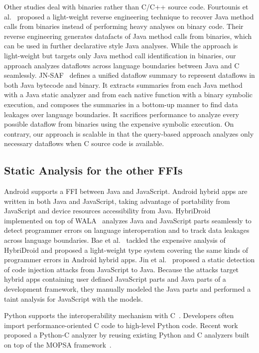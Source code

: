 Other studies deal with binaries rather than C/C++ source code.  Fourtounis et
al.~\cite{scanning} proposed a light-weight reverse engineering technique to
recover Java method calls from binaries instead of performing heavy analyses on
binary code.  Their reverse engineering generates datafacts of Java method
calls from binaries, which can be used in further declarative style Java
analyses. While the approach is light-weight but targets only Java method call
identification in binaries, our approach analyzes dataflows across language
boundaries between Java and C seamlessly.  JN-SAF~\cite{JN-SAF} defines a
unified dataflow summary to represent dataflows in both Java bytecode and
binary.  It extracts summaries from each Java method with a Java static
analyzer and from each native function with a binary symbolic execution, and
composes the summaries in a bottom-up manner to find data leakages over
language boundaries.  It sacrifices performance to analyze every possible
dataflow from binaries using the expensive symbolic execution. On contrary, our
approach is scalable in that the query-based approach analyzes only necessary
dataflows when C source code is available.


\subsection{Static Analysis for the other FFIs}
Android supports a FFI between Java and JavaScript.  Android hybrid apps are
written in both Java and JavaScript, taking advantage of portability from
JavaScript and device resources accessibility from Java.
HybriDroid~\cite{hybridroid} implemented on top of WALA~\cite{WALA} analyzes
Java and JavaScript parts seamlessly to detect programmer errors on language
interoperation and to track data leakages across language boundaries.  Bae et
al.~\cite{BaeICSE19} tackled the expensive analysis of HybriDroid and proposed
a light-weight type system covering the same kinds of programmer errors in
Android hybrid apps.  Jin et al.~\cite{jin2014code} proposed a static detection
of code injection attacks from JavaScript to Java.  Because the attacks target
hybrid apps containing user defined JavaScript parts and Java parts of a
development framework, they manually modeled the Java parts and performed a
taint analysis for JavaScript with the models.


Python supports the interoperability mechanism with C~\cite{PythonC}.
Developers often import performance-oriented C code to high-level Python code.
Recent work~\cite{sas2021} proposed a Python-C analyzer by reusing existing
Python and C analyzers built on top of the MOPSA framework~\cite{Mopsa}.  


